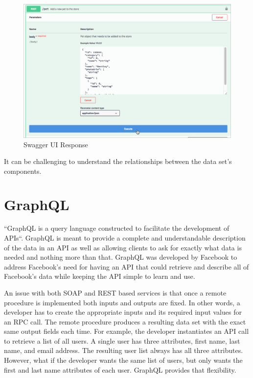 \begin{figure}[!ht]
  \centering\includegraphics[width=\columnwidth]{images/swaggerui_execute.png}
  \caption{Swagger UI Response}\label{f:swagger-resp}
\end{figure}
It can be challenging to understand the relationships between the data set's 
components.

\section{GraphQL}
``GraphQL is a query language constructed to facilitate the development of APIs``\cite{FacebookGraphQL2018}.
GraphQL is meant to provide a complete and understandable description of the
data in an API as well as allowing clients to ask for exactly what data is 
needed and nothing more than that\cite{FacebookGraphQL2018}.  GraphQL was 
developed by Facebook to address Facebook's need for having an API that could 
retrieve and describe all of Facebook's data while keeping the API simple to 
learn and use\cite{Byron2015}.

An issue with both SOAP and REST based services is that once a remote
procedure is implemented both inputs and outputs are fixed.  In other words,
a developer has to create the appropriate inputs and its required input values
for an RPC call.  The remote procedure produces a resulting data set with the
exact same output fields each time.  For example, the developer instantiates an
API call to retrieve a list of all users.  A single user has three attributes,
first name, last name, and email address.  The resulting user list always has
all three attributes.  However, what if the developer wants the same list of
users, but only wants the first and last name attributes of each user.  GraphQL
provides that flexibility.

